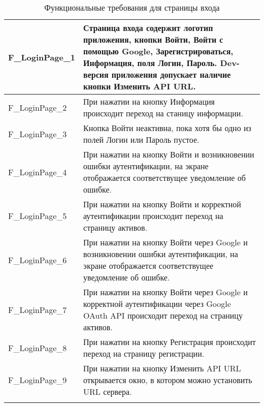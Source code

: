 \documentclass[a4paper, 14pt]{article}
\begin{document}
\begin{longtable}{| p{} | p{} |}
    F\_LoginPage\_1                 & Страница входа содержит логотип приложения, кнопки Войти, Войти с помощью Google, Зарегистрироваться, Информация, поля Логин, Пароль. Dev-версия приложения допускает наличие кнопки Изменить API URL.                                                  \\ \hline
    F\_LoginPage\_2                 & При нажатии на кнопку Информация происходит переход на станицу информации.                                                                                                         \\ \hline
    F\_LoginPage\_3                 & Кнопка Войти неактивна, пока хотя бы одно из полей Логин или Пароль пустое.                                                                                                        \\ \hline
    F\_LoginPage\_4                 & При нажатии на кнопку Войти и возникновении ошибки аутентификации, на экране отображается соответствущее уведомление об ошибке.                                                    \\ \hline
    F\_LoginPage\_5                 & При нажатии на кнопку Войти и корректной аутентификации происходит переход на страницу активов.                                                                                    \\ \hline
    F\_LoginPage\_6                 & При нажатии на кнопку Войти через Google и возникновении ошибки аутентификации, на экране отображается соответствущее уведомление об ошибке.                                       \\ \hline
    F\_LoginPage\_7                 & При нажатии на кнопку Войти через Google и корректной аутентификации через Google OAuth API происходит переход на страницу активов.                                                \\ \hline
    F\_LoginPage\_8                 & При нажатии на кнопку Регистрация происходит переход на страницу регистрации.                                                                                                      \\ \hline
    F\_LoginPage\_9                 & При нажатии на кнопку Изменить API URL открывается окно, в котором можно установить URL сервера.                                                                                                      \\ \hline

    \caption{Функциональные требования для страницы входа}
\end{longtable}
\end{document}
